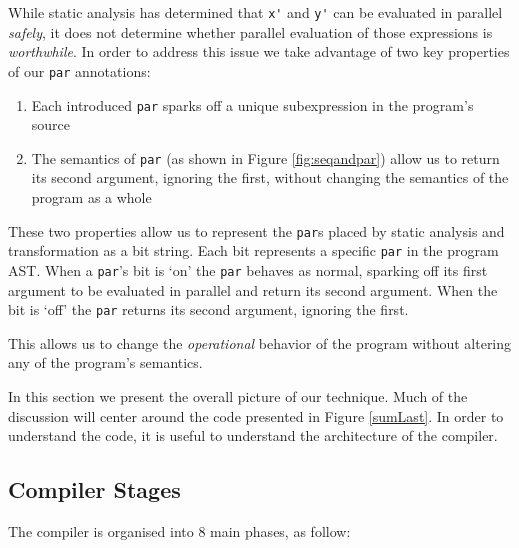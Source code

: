 %
While static analysis has determined that \verb-x'- and \verb-y'- can be
evaluated in parallel \emph{safely}, it does not determine whether parallel
evaluation of those expressions is \emph{worthwhile}. In order to address this
issue we take advantage of two key properties of our \verb-par- annotations:

\begin{enumerate}
    \item Each introduced \verb-par- sparks off a unique subexpression
            in the program's source
    \item The semantics of \verb-par- (as shown in Figure \ref{fig:seqandpar})
            allow us to return its second argument, ignoring the first,
            without changing the semantics of the program as a whole
\end{enumerate}

These two properties allow us to represent the \verb-par-s placed by static
analysis and transformation as a bit string. Each bit represents a specific
\verb-par- in the program AST. When a \verb-par-'s bit is `on' the \verb-par-
behaves as normal, sparking off its first argument to be evaluated in parallel
and return its second argument. When the bit is `off' the \verb-par- returns
its second argument, ignoring the first.

This allows us to change the \emph{operational} behavior of the program without
altering any of the program's semantics.


In this section we present the overall picture of our technique. Much of the
discussion will center around the code presented in Figure \ref{sumLast}. In
order to understand the code, it is useful to understand the architecture of the
compiler.

\subsection{Compiler Stages}
The compiler is organised into 8 main phases, as follow:

